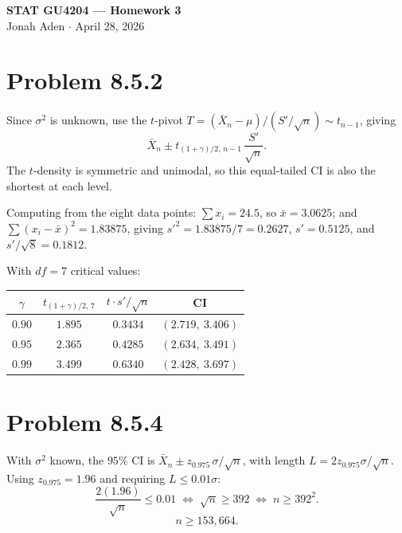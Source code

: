 \documentclass[11pt]{article}
\begin{document}
\begin{center}
    {\large\textbf{STAT GU4204 --- Homework 3}}\\[2pt]
    {\small Jonah Aden \quad $\cdot$ \quad April 28, 2026}
\end{center}

\vspace{0.5em}

\section*{Problem 8.5.2}

Since $\sigma^2$ is unknown, use the $t$-pivot
$T = (\bar{X}_n - \mu)/(S'/\sqrt{n}) \sim t_{n-1}$, giving
\[
\bar{X}_n \pm t_{(1+\gamma)/2,\,n-1}\,\frac{S'}{\sqrt{n}}.
\]
The $t$-density is symmetric and unimodal, so this equal-tailed CI is also the shortest at each level.

Computing from the eight data points: $\sum x_i = 24.5$, so $\bar{x} = 3.0625$; and $\sum (x_i - \bar{x})^2 = 1.83875$, giving $s'^2 = 1.83875/7 = 0.2627$, $s' = 0.5125$, and $s'/\sqrt{8} = 0.1812$.

With $df = 7$ critical values:

\begin{center}
\begin{tabular}{c c c c}
$\gamma$ & $t_{(1+\gamma)/2,\,7}$ & $t \cdot s'/\sqrt{n}$ & CI \\
\hline
$0.90$ & $1.895$ & $0.3434$ & $\boxed{(2.719,\ 3.406)}$ \\[2pt]
$0.95$ & $2.365$ & $0.4285$ & $\boxed{(2.634,\ 3.491)}$ \\[2pt]
$0.99$ & $3.499$ & $0.6340$ & $\boxed{(2.428,\ 3.697)}$ \\
\end{tabular}
\end{center}

\section*{Problem 8.5.4}

With $\sigma^2$ known, the $95\%$ CI is $\bar{X}_n \pm z_{0.975}\,\sigma/\sqrt{n}$, with length $L = 2z_{0.975}\sigma/\sqrt{n}$. Using $z_{0.975} = 1.96$ and requiring $L \le 0.01\sigma$:
\[
\frac{2(1.96)}{\sqrt{n}} \le 0.01
\;\Longleftrightarrow\;
\sqrt{n} \ge 392
\;\Longleftrightarrow\;
n \ge 392^2.
\]
\[
\boxed{n \ge 153{,}664.}
\]
\end{document}
